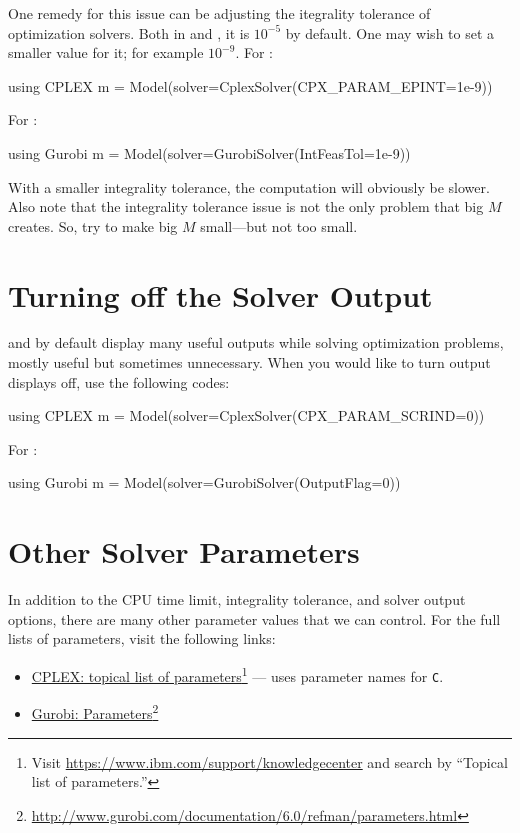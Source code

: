 One remedy for this issue can be adjusting the itegrality tolerance of optimization solvers. Both in \cplex{} and \gurobi{}, it is $10^{-5}$ by default. One may wish to set a smaller value for it; for example $10^{-9}$. For \cplex{}:
\begin{code}
using CPLEX
m = Model(solver=CplexSolver(CPX_PARAM_EPINT=1e-9))
\end{code}
\noindent For \gurobi{}:
\begin{code}
using Gurobi
m = Model(solver=GurobiSolver(IntFeasTol=1e-9))
\end{code}

With a smaller integrality tolerance, the computation will obviously be slower. Also note that the integrality tolerance issue is not the only problem that big $M$ creates. So, try to make big $M$ small---but not too small.




\section{Turning off the Solver Output}

\cplex{} and \gurobi{} by default display many useful outputs while solving optimization problems, mostly useful but sometimes unnecessary. When you would like to turn output displays off, use the following codes:
\begin{code}
using CPLEX
m = Model(solver=CplexSolver(CPX_PARAM_SCRIND=0))
\end{code}
\noindent For \gurobi{}:
\begin{code}
using Gurobi
m = Model(solver=GurobiSolver(OutputFlag=0))
\end{code}




\section{Other Solver Parameters}

In addition to the CPU time limit, integrality tolerance, and solver output options, there are many other parameter values that we can control. For the full lists of parameters, visit the following links:

\begin{itemize}
\item \href{http://www-01.ibm.com/support/knowledgecenter/SSSA5P_12.4.0/ilog.odms.cplex.help/CPLEX/Parameters_reference/topics/introListTopical.html?lang=en}{CPLEX: topical list of parameters}\footnote{Visit \url{https://www.ibm.com/support/knowledgecenter} and search by ``Topical list of parameters.''} --- \julia{} uses parameter names for \texttt{C}.
\item \href{http://www.gurobi.com/documentation/6.0/refman/parameters.html}{Gurobi: Parameters}\footnote{\url{http://www.gurobi.com/documentation/6.0/refman/parameters.html}}
\end{itemize}




